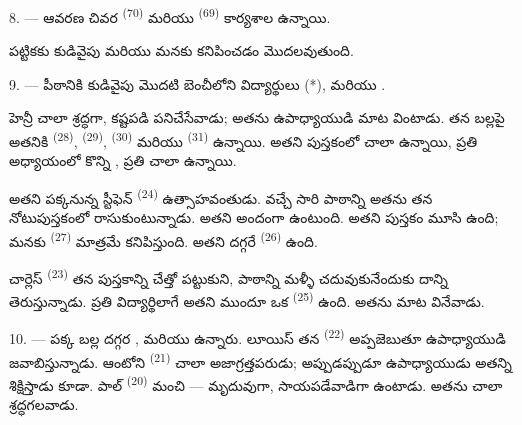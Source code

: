 8. --- ఆవరణ చివర  \textsuperscript{(70)} మరియు 
\textsuperscript{(69)} కార్యశాల ఉన్నాయి.

పట్టికకు కుడివైపు  మరియు   మనకు
కనిపించడం మొదలవుతుంది.


\VUsaut{2.4mm}

\VUsaut{3.0mm}

9. --- పీఠానికి కుడివైపు మొదటి బెంచీలోని విద్యార్థులు  (*), 
మరియు .

హెన్రీ చాలా శ్రద్ధగా, కష్టపడి పనిచేసేవాడు; అతను ఉపాధ్యాయుడి మాట వింటాడు. తన బల్లపై అతనికి
 \textsuperscript{(28)},  \textsuperscript{(29)},
 \textsuperscript{(30)} మరియు  \textsuperscript{(31)}
ఉన్నాయి. అతని పుస్తకంలో చాలా  ఉన్నాయి, ప్రతి అధ్యాయంలో కొన్ని
, ప్రతి  చాలా  ఉన్నాయి.

అతని పక్కనున్న స్టీఫెన్ \textsuperscript{(24)} ఉత్సాహవంతుడు. వచ్చే సారి పాఠాన్ని అతను తన
నోటుపుస్తకంలో రాసుకుంటున్నాడు. అతని  అందంగా ఉంటుంది. అతని పుస్తకం మూసి ఉంది;
మనకు  \textsuperscript{(27)} మాత్రమే కనిపిస్తుంది. అతని దగ్గరే
 \textsuperscript{(26)} ఉంది.

చార్లెస్ \textsuperscript{(23)} తన పుస్తకాన్ని చేత్తో పట్టుకుని, పాఠాన్ని మళ్ళీ చదువుకునేందుకు
దాన్ని తెరుస్తున్నాడు. ప్రతి విద్యార్థిలాగే అతని ముందూ ఒక 
\textsuperscript{(25)} ఉంది. అతను మాట వినేవాడు.

10. --- పక్క బల్ల దగ్గర ,  మరియు  ఉన్నారు. లూయిస్
తన  \textsuperscript{(22)} అప్పజెబుతూ ఉపాధ్యాయుడి 
జవాబిస్తున్నాడు. ఆంటోని \textsuperscript{(21)} చాలా అజాగ్రత్తపరుడు; అప్పుడప్పుడూ ఉపాధ్యాయుడు
అతన్ని శిక్షిస్తాడు కూడా. పాల్ \textsuperscript{(20)} మంచి  — మృదువుగా,
సాయపడేవాడిగా ఉంటాడు. అతను చాలా శ్రద్ధగలవాడు.

